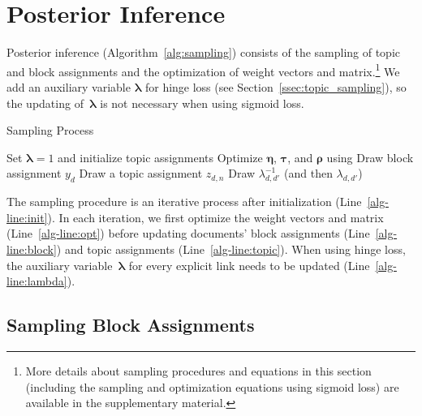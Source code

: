 \section{Posterior Inference}
\label{sec:inference}

Posterior inference (Algorithm~\ref{alg:sampling}) consists of the sampling of
topic and block assignments and the optimization of weight vectors and
matrix.\footnote{More details about sampling procedures and equations in this
  section (including the sampling and optimization equations using sigmoid loss)
  are available in the supplementary material.}  We add an auxiliary variable
$\bm{\lambda}$ for hinge loss (see Section~\ref{ssec:topic_sampling}), so the
updating of~$\bm{\lambda}$ is not necessary when using sigmoid loss.

\begin{algorithm}[t!]
\caption{Sampling Process}\label{alg:sampling}
\begin{algorithmic}[1]
    \State Set $\bm{\lambda}=1$ and initialize topic assignments \label{alg-line:init}
        \State Optimize $\bm{\eta}$, $\bm{\tau}$, and $\bm{\rho}$ using \lbfgs \label{alg-line:opt}
            \State Draw block assignment $y_d$ \label{alg-line:block}
                \State Draw a topic assignment $z_{d,n}$ \label{alg-line:topic}
            \EndFor
                \State Draw $\lambda_{d,d'}^{-1}$ (and then $\lambda_{d,d'}$) \label{alg-line:lambda}
            \EndFor
        \EndFor
    \EndFor
\end{algorithmic}
\end{algorithm}

The sampling procedure is an iterative process after initialization
(Line~\ref{alg-line:init}).  In each iteration, we first optimize the
weight vectors and matrix (Line~\ref{alg-line:opt}) before updating
documents' block assignments (Line~\ref{alg-line:block}) and topic
assignments (Line~\ref{alg-line:topic}).  When using hinge loss, the
auxiliary variable~$\bm{\lambda}$ for every explicit link needs to be
updated (Line~\ref{alg-line:lambda}).

\subsection{Sampling Block Assignments}
\label{ssec:block_sampling}

